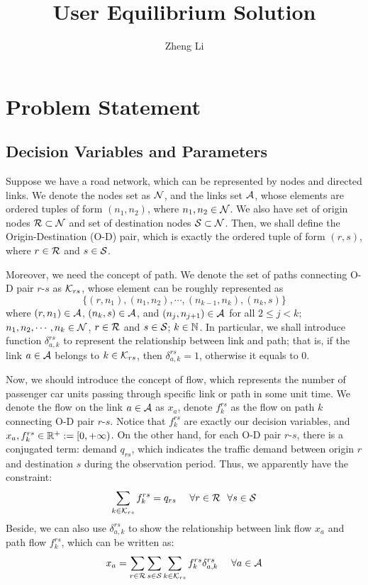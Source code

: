 \documentclass{article}
\title{User Equilibrium Solution}
\author{Zheng Li}
\begin{document}
\maketitle


\section{Problem Statement}

\subsection{Decision Variables and Parameters}

Suppose we have a road network, which can be represented by nodes and directed links. We denote the nodes set as $ \mathcal{N} $, and the links set $ \mathcal{A} $, whose elements are ordered tuples of form $ (n_1, n_2) $, where $ n_1, n_2 \in \mathcal{N} $. We also have set of origin nodes $ \mathcal{R} \subset \mathcal{N} $ and set of destination nodes $ \mathcal{S} \subset \mathcal{N} $. Then, we shall define the Origin-Destination (O-D) pair, which is exactly the ordered tuple of form $ (r, s) $, where $ r \in \mathcal{R} $ and $ s \in \mathcal{S} $.

Moreover, we need the concept of path. We denote the set of paths connecting O-D pair $ r $-$ s $ as $ \mathcal{K}_{rs} $, whose element can be roughly represented as
$$ \{ (r, n_1), (n_1, n_2), \cdots, (n_{k-1}, n_k), (n_k, s) \} $$ 
where $ (r, n_1) \in \mathcal{A} $, $ (n_k, s) \in \mathcal{A} $, and $ (n_j, n_{j+1}) \in \mathcal{A} $ for all $ 2 \le j < k $; $ n_1, n_2, \cdots, n_k \in \mathcal{N} $, $ r \in \mathcal{R} $ and $ s \in \mathcal{S} $; $ k \in \mathbb{N} $. In particular, we shall introduce function $ \delta_{a, k}^{rs} $ to represent the relationship between link and path; that is, if the link $ a \in \mathcal{A} $ belongs to $ k \in \mathcal{K}_{rs} $, then $ \delta_{a, k}^{rs} = 1 $, otherwise it equals to $ 0 $.

Now, we should introduce the concept of flow, which represents the number of passenger car units passing through specific link or path in some unit time. We denote the flow on the link $ a \in \mathcal{A} $ as $ x_a $, denote $ f_k^{rs} $ as the flow on path $ k $ connecting O-D pair $ r $-$ s $. Notice that $ f_k^{rs} $ are exactly our decision variables, and $ x_a, f_k^{rs} \in \mathbb{R}^+ := [0, + \infty) $. On the other hand, for each O-D pair $ r $-$ s $, there is a conjugated term: demand $ q_{rs} $, which indicates the traffic demand between origin $ r $ and destination $ s $ during the observation period. Thus, we apparently have the constraint: 
$$ \sum_{k \in \mathcal{K}_{rs}} f_{k}^{rs} = q_{rs} ~~~~ \forall r \in \mathcal{R} ~~ \forall s \in \mathcal{S} $$
Beside, we can also use $ \delta_{a, k}^{rs} $ to show the relationship between link flow $ x_a $ and path flow $ f_k^{rs} $, which can be written as: 
\begin{equation} \label{eq-path-flow-to-link-flow}
    x_a = \sum_{r \in \mathcal{R}} \sum_{s \in \mathcal{S}} \sum_{k \in \mathcal{K}_{rs}} f_{k}^{rs} \delta_{a, k}^{rs} ~~~~ \forall a \in \mathcal{A}
\end{equation}
\end{document}
